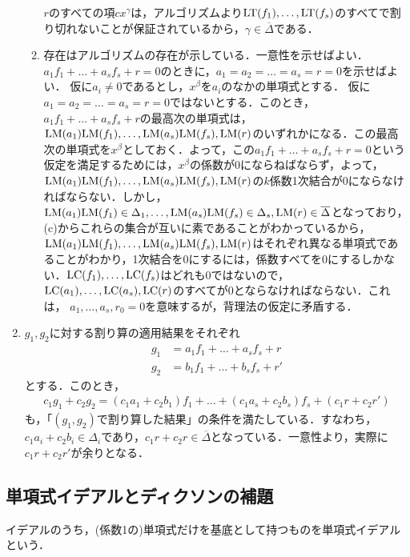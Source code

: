 \documentclass[9pt]{ltjsarticle}
\theoremstyle{break}
\theoremstyle{break}
\theoremstyle{break}
\theoremstyle{break}
\theoremstyle{break}
\theoremstyle{break}
\theoremstyle{break}
\theoremstyle{break}
\theoremstyle{break}
\theoremstyle{break}
\theoremstyle{break}
\theoremstyle{break}
\theoremstyle{break}
\theoremstyle{break}
\theoremstyle{break}
\theoremstyle{nonumberbreak}
\theoremstyle{nonumberbreak}
\begin{document}
\begin{enumerate}[label=(問題\arabic*)]
\begin{enumerate}[label=(\alph*)]
$r$のすべての項$cx^\gamma$は，アルゴリズムより${\rm LT}(f_1),\dots,{\rm LT}(f_s)$のすべてで割り切れないことが保証されているから，$\gamma \in \overline \Delta$である．
 \item
存在はアルゴリズムの存在が示している．一意性を示せばよい．$a_1 f_1 + \dots + a_s f_s +r = 0$のときに，$a_1=a_2=\dots=a_s = r=0$を示せばよい．
仮に$a_i\neq 0$であるとし，$x^\beta$を$a_i$のなかの単項式とする．
仮に$a_1=a_2=\dots=a_s=r=0$ではないとする．このとき，$a_1f_1 + \dots + a_s f_s +r$の最高次の単項式は，${\rm LM}(a_1){\rm LM}(f_1),\dots,{\rm LM}(a_s){\rm LM}(f_s),{\rm LM}(r)$のいずれかになる．この最高次の単項式を$x^\beta$としておく．よって，この$a_1f_1 + \dots + a_s f_s + r=0$という仮定を満足するためには，$x^\beta$の係数が0にならねばならず，よって，${\rm LM}(a_1){\rm LM}(f_1),\dots,{\rm LM}(a_s){\rm LM}(f_s),{\rm LM}(r)$の$k$係数1次結合が0にならなければならない．しかし，${\rm LM}(a_1){\rm LM}(f_1) \in \Delta_1,\dots,{\rm LM}(a_s){\rm LM}(f_s)\in \Delta_s,{\rm LM}(r)\in \overline\Delta$となっており，(c)からこれらの集合が互いに素であることがわかっているから，${\rm LM}(a_1){\rm LM}(f_1),\dots, {\rm LM}(a_s){\rm LM}(f_s),{\rm LM}(r)$はそれぞれ異なる単項式であることがわかり，1次結合を0にするには，係数すべてを0にするしかない．${\rm LC}(f_1),\dots,{\rm LC}(f_s)$はどれも0ではないので，
${\rm LC}(a_1),\dots,{\rm LC}(a_s),{\rm LC}(r)$のすべてが0とならなければならない．これは，
$a_1,\dots,a_s,r_0=0$を意味するが，背理法の仮定に矛盾する．
\end{enumerate}
 \item $g_1,g_2$に対する割り算の適用結果をそれぞれ
\begin{align}
 g_1 &= a_1 f_1 + \dots + a_s f_s + r\\
 g_2 & = b_1 f_1 + \dots + b_s f_s + r'
\end{align}
とする．このとき，
\begin{align}
 c_1 g_1 + c_2 g_2 = (c_1 a_1 + c_2 b_1)f_1 + \dots + (c_1 a_s + c_2 b_s)f_s + (c_1 r+c_2 r')
\end{align}
も，「$(g_1,g_2)$で割り算した結果」の条件を満たしている．すなわち，
$c_1 a_i+c_2 b_i \in \Delta_i$であり，$c_1 r+c_2 r\in \overline \Delta$となっている．一意性より，実際に$c_1 r+ c_2 r'$が余りとなる．
\end{enumerate}

\subsection{単項式イデアルとディクソンの補題}
イデアルのうち，(係数1の)単項式だけを基底として持つものを単項式イデアルという．
\end{document}

